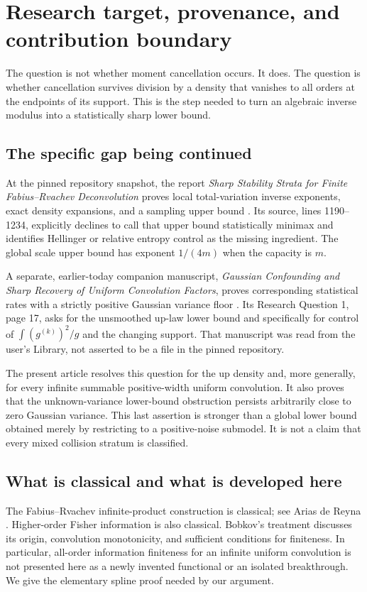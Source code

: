 \documentclass[11pt,a4paper]{article}
\numberwithin{equation}{section}
\theoremstyle{definition}
\theoremstyle{remark}
\begin{document}
\section{Research target, provenance, and contribution boundary}
\label{sec:scope}

The question is not whether moment cancellation occurs. It does. The question
is whether cancellation survives division by a density that vanishes to all
orders at the endpoints of its support. This is the step needed to turn an
algebraic inverse modulus into a statistically sharp lower bound.

\subsection{The specific gap being continued}
At the pinned repository snapshot, the report \emph{Sharp Stability Strata
for Finite Fabius--Rvachev Deconvolution} proves local total-variation inverse
exponents, exact density expansions, and a sampling upper bound
\cite{repo-strata}. Its source, lines 1190--1234, explicitly declines to call
that upper bound statistically minimax and identifies Hellinger or relative
entropy control as the missing ingredient. The global scale upper bound has
exponent $1/(4m)$ when the capacity is $m$.

A separate, earlier-today companion manuscript, \emph{Gaussian Confounding
and Sharp Recovery of Uniform Convolution Factors}, proves corresponding
statistical rates with a strictly positive Gaussian variance floor
\cite{companion}. Its Research Question 1, page 17, asks for the unsmoothed
up-law lower bound and specifically for control of
$\int (g^{(k)})^2/g$ and the changing support. That manuscript was read from
the user's Library, not asserted to be a file in the pinned repository.

The present article resolves this question for the up density and, more
generally, for every infinite summable positive-width uniform convolution.
It also proves that the unknown-variance lower-bound obstruction persists
arbitrarily close to zero Gaussian variance. This last assertion is stronger
than a global lower bound obtained merely by restricting to a positive-noise
submodel. It is not a claim that every mixed collision stratum is classified.

\subsection{What is classical and what is developed here}
The Fabius--Rvachev infinite-product construction is classical; see Arias de
Reyna \cite{arias}. Higher-order Fisher information is also classical.
Bobkov's treatment \cite{bobkov} discusses its origin, convolution
monotonicity, and sufficient conditions for finiteness. In particular,
all-order information finiteness for an infinite uniform convolution is not
presented here as a newly invented functional or an isolated breakthrough.
We give the elementary spline proof needed by our argument.
\end{document}
